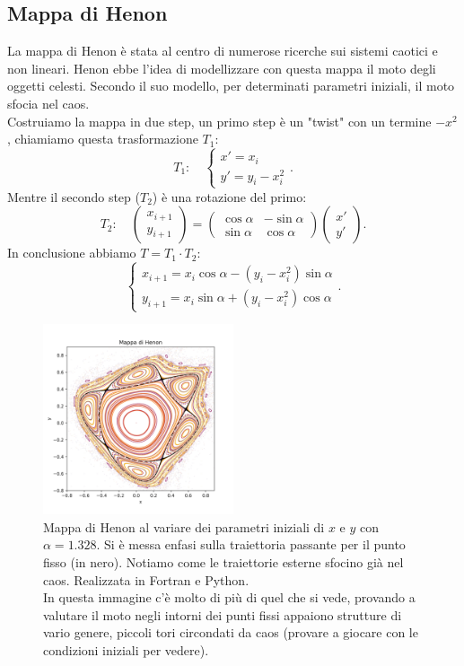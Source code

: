 \subsection{Mappa di Henon}%
\label{sub:Mappa di Henon}
La mappa di Henon è stata al centro di numerose ricerche sui sistemi caotici e non lineari. Henon ebbe l'idea di modellizzare con questa mappa il moto degli oggetti celesti. Secondo il suo modello, per determinati parametri iniziali, il moto sfocia nel caos.\\
Costruiamo la mappa in due step, un primo step è un "twist" con un termine $-x^2$, chiamiamo questa trasformazione $T_1$:
\[
    T_1: \quad
    \begin{cases}
        x' = x_i\\
	y' = y_i-x_i^2
    \end{cases}
.\] 
Mentre il secondo step ($T_2$) è una rotazione del primo:
\[
    T_2: \quad
    \begin{pmatrix} x_{i+1} \\ y_{i+1} \end{pmatrix} =
    \begin{pmatrix} 
	\cos\alpha  &  - \sin\alpha  \\
	\sin\alpha  &  \cos\alpha
    \end{pmatrix} 
    \begin{pmatrix} x' \\ y' \end{pmatrix} 
.\] 
In conclusione abbiamo $T = T_1\cdot T_2$:
\[
    \begin{cases}
	x_{i+1} = x_i\cos\alpha-(y_i-x_i^2)\sin\alpha\\
	y_{i+1} = x_i\sin\alpha + (y_i-x_i^2)\cos\alpha
    \end{cases}
.\] 
\begin{figure}[H]
    \centering
    \includegraphics[width=0.5\textwidth]{figures/18_Henon_map.png}
    \caption{\scriptsize Mappa di Henon al variare dei parametri iniziali di $x$ e $y$ con $\alpha = 1.328$. Si è messa enfasi sulla traiettoria passante per il punto fisso (in nero). Notiamo come le traiettorie esterne sfocino già nel caos. Realizzata in Fortran e Python.\\
    In questa immagine c'è molto di più di quel che si vede, provando a valutare il moto negli intorni dei punti fissi appaiono strutture di vario genere, piccoli tori circondati da caos (provare a giocare con le condizioni iniziali per vedere).}
    \label{fig:figures-18_Henon_map-png}
\end{figure}
